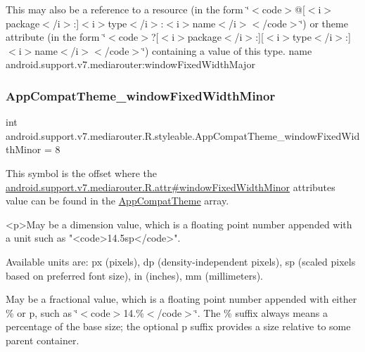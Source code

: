 This may also be a reference to a resource (in the form \char`\"{}$<$code$>$@\mbox{[}$<$i$>$package$<$/i$>$\+:\mbox{]}$<$i$>$type$<$/i$>$\+:$<$i$>$name$<$/i$>$$<$/code$>$\char`\"{}) or theme attribute (in the form \char`\"{}$<$code$>$?\mbox{[}$<$i$>$package$<$/i$>$\+:\mbox{]}\mbox{[}$<$i$>$type$<$/i$>$\+:\mbox{]}$<$i$>$name$<$/i$>$$<$/code$>$\char`\"{}) containing a value of this type.  name android.\+support.\+v7.\+mediarouter\+:window\+Fixed\+Width\+Major \mbox{\label{classandroid_1_1support_1_1v7_1_1mediarouter_1_1R_1_1styleable_a291edfbcc421e452ee7b5b1b806fdd68}} 
\subsubsection{\texorpdfstring{App\+Compat\+Theme\+\_\+window\+Fixed\+Width\+Minor}{AppCompatTheme\_windowFixedWidthMinor}}
{\footnotesize\ttfamily int android.\+support.\+v7.\+mediarouter.\+R.\+styleable.\+App\+Compat\+Theme\+\_\+window\+Fixed\+Width\+Minor = 8\hspace{0.3cm}{\ttfamily [static]}}

This symbol is the offset where the \hyperlink{classandroid_1_1support_1_1v7_1_1mediarouter_1_1R_1_1attr_ad959f251618f4e05f6853816fcab195d}{android.\+support.\+v7.\+mediarouter.\+R.\+attr\#window\+Fixed\+Width\+Minor} attribute\textquotesingle{}s value can be found in the \hyperlink{classandroid_1_1support_1_1v7_1_1mediarouter_1_1R_1_1styleable_a4e3d3900c75d49aeb2f283cac00214d6}{App\+Compat\+Theme} array.

\begin{DoxyVerb}      <p>May be a dimension value, which is a floating point number appended with a unit such as "<code>14.5sp</code>".
\end{DoxyVerb}
 Available units are\+: px (pixels), dp (density-\/independent pixels), sp (scaled pixels based on preferred font size), in (inches), mm (millimeters). 

May be a fractional value, which is a floating point number appended with either \% or p, such as \char`\"{}$<$code$>$14.\%$<$/code$>$\char`\"{}. The \% suffix always means a percentage of the base size; the optional p suffix provides a size relative to some parent container. 


